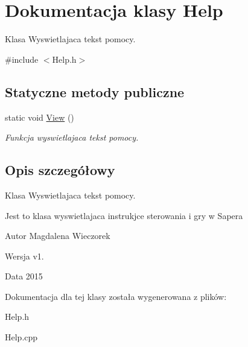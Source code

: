 \hypertarget{class_help}{}\section{Dokumentacja klasy Help}
\label{class_help}


Klasa Wyswietlajaca tekst pomocy.  




{\ttfamily \#include $<$Help.\+h$>$}

\subsection*{Statyczne metody publiczne}
\begin{DoxyCompactItemize}
\item 
\hypertarget{class_help_ac985b795e504eec0e66a2d64ea380f33}{}static void \hyperlink{class_help_ac985b795e504eec0e66a2d64ea380f33}{View} ()\label{class_help_ac985b795e504eec0e66a2d64ea380f33}

\begin{DoxyCompactList}\small\item\em Funkcja wyswietlajaca tekst pomocy. \end{DoxyCompactList}\end{DoxyCompactItemize}


\subsection{Opis szczegółowy}
Klasa Wyswietlajaca tekst pomocy. 

Jest to klasa wyswietlajaca instrukjce sterowania i gry w Sapera \begin{DoxyAuthor}{Autor}
Magdalena Wieczorek 
\end{DoxyAuthor}
\begin{DoxyVersion}{Wersja}
v1. 
\end{DoxyVersion}
\begin{DoxyDate}{Data}
2015 
\end{DoxyDate}


Dokumentacja dla tej klasy została wygenerowana z plików\+:\begin{DoxyCompactItemize}
\item 
Help.\+h\item 
Help.\+cpp\end{DoxyCompactItemize}
